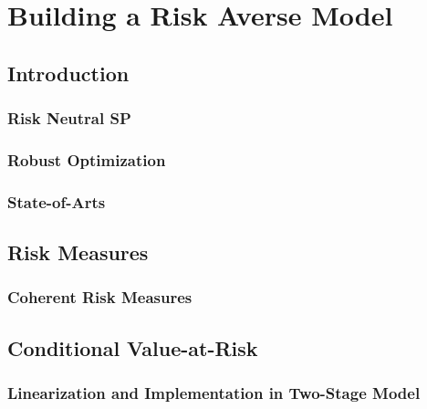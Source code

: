 \chapter{Building a Risk Averse Model}

\section{Introduction}
\subsection{Risk Neutral SP}
\subsection{Robust Optimization}
\subsection{State-of-Arts}

\section{Risk Measures}

\subsection{Coherent Risk Measures}

\section{Conditional Value-at-Risk}
\subsection{Linearization and Implementation in Two-Stage Model}
